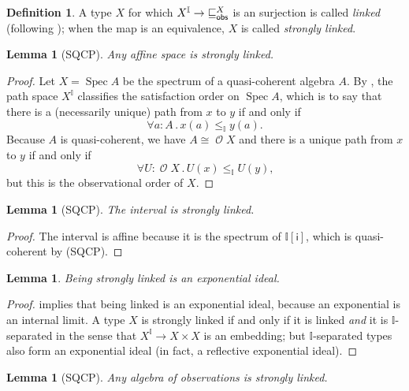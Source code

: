 \documentclass[a4paper,12pt]{amsart}
\newtheorem{lemma}[theorem]{Lemma}
\theoremstyle{definition}
\newtheorem{definition}[theorem]{Definition}
\newcommand{\mc}[1]{\mathcal{#1}}
\newcommand{\mbb}[1]{\mathbb{#1}}
\newcommand{\I}{\mbb I}
\newcommand{\ms}[1]{\mathsf{#1}}
\newcommand{\fa}[2]{\forall #1\!\colon\!\!#2\mathpunct{.}}
\newcommand{\spec}{\operatorname{Spec}}
\newcommand{\opens}{\operatorname{\mc{O}}} %
\begin{document}
\begin{definition}
  A type $X$ for which $X^\I\to {\obsle[X]}$ is an surjection is called \emph{linked} (following \citet{PhoaWesleyKym-Son1991DtiR}); when the map is an equivalence, $X$ is called \emph{strongly linked}.
\end{definition}

\begin{lemma}[SQCP]\label{lem:affine-strongly-linked}
  Any affine space is strongly linked.
\end{lemma}

\begin{proof}
  Let $X=\spec{A}$ be the spectrum of a quasi-coherent algebra $A$. 
  By , the path space $X^\I$ classifies the satisfaction order on $\spec{A}$, which is to say that there is a (necessarily unique) path from $x$ to $y$ if and only if \[\fa{a}{A} x(a)\le_\I y(a)\text{.}\] Because $A$ is quasi-coherent, we have $A\cong \opens X$ and there is a unique path from $x$ to $y$ if and only if \[\fa{U}{\opens{X}} U(x)\le_\I U(y)\text{,}\] but this is the observational order of $X$.
\end{proof}

\begin{lemma}[SQCP]\label{lem:int-strong-link}
  The interval is strongly linked.
\end{lemma}

\begin{proof}
  The interval is affine because it is the spectrum of $\I[\ms{i}]$, which is quasi-coherent by (SQCP).
\end{proof}

\begin{lemma}\label{lem:strong-link-exp-ideal}
  Being strongly linked is an exponential ideal.
\end{lemma}

\begin{proof}
  \citet[Prop.\ 5.4.4]{PhoaWesleyKym-Son1991DtiR} implies that being linked is an exponential ideal, because an exponential is an internal limit. A type $X$ is strongly linked if and only if it is linked \emph{and} it is $\I$-separated in the sense that $X^\I\to X\times X$ is an embedding; but $\I$-separated types also form an exponential ideal (in fact, a reflective exponential ideal).
\end{proof}

\begin{lemma}[SQCP]\label{lem:O-strongly-linked}
  Any algebra of observations is strongly linked.
\end{lemma}
\end{document}
